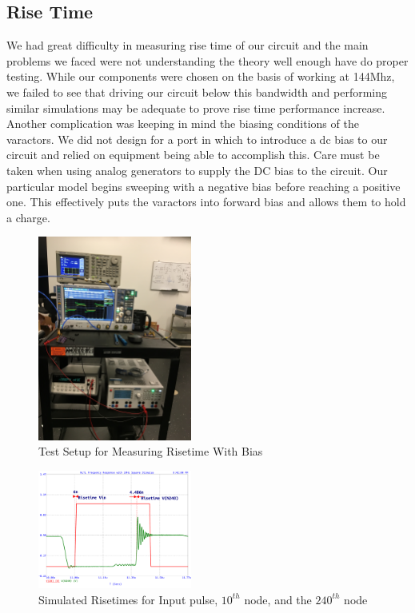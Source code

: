 \documentclass[journal]{IEEEtran}
\begin{document}
\subsection{Rise Time}\label{RiseTimeMeasResults}

We had great difficulty in measuring rise time of our circuit and the main problems we faced were not understanding the theory well enough have do proper testing. While our components were chosen on the basis of working at 144Mhz, we failed to see that driving our circuit below this bandwidth and performing similar simulations may be adequate to prove rise time performance increase. Another complication was keeping in mind the biasing conditions of the varactors. We did not design for a port in which to introduce a dc bias to our circuit and relied on equipment being able to accomplish this. Care must be taken when using analog generators to supply the DC bias to the circuit. Our particular model begins sweeping with a negative bias before reaching a positive one. This effectively puts the varactors into forward bias and allows them to hold a charge. 






\begin{figure}[htb]
\centering
\includegraphics[width=0.45\textwidth,angle = -90]{SetupWithBiasing.JPG}
\caption{Test Setup for Measuring Risetime With Bias}
\label{fig:SetupWBiasing}
\end{figure}


\begin{figure}[htb]
\centering
\includegraphics[width=0.45\textwidth]{Probed_Input_N10_N240_NoSeriesResistance}
\caption{Simulated Risetimes for Input pulse, $10^{th}$ node, and the $240^{th}$ node}
\label{fig:probedNoResistance}
\end{figure}
\end{document}
